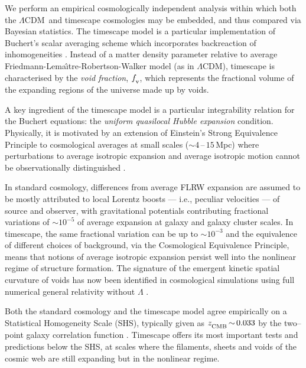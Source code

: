 \documentclass[fleqn,usenatbib,onecolumn,referee]{mnras}
\newcommand{\LA}{\Lambda}
\newcommand{\LCDM}{$\LA$CDM}
\newcommand{\goesas}{\mathop{\sim}\limits}
\newcommand{\Ns}[1]{_{\lower2pt\hbox{$\scriptstyle\rm#1$}}}
\begin{document}
We perform an empirical cosmologically independent analysis within which both the \LCDM\ and timescape cosmologies may be embedded, and thus compared via Bayesian statistics. The timescape model is a particular implementation of Buchert’s scalar averaging scheme which incorporates backreaction of inhomogeneities \citep{Buchert_2000, Buchert_2001, Buchert_2020, Wiltshire_2014_cosmic}. Instead of a matter density parameter relative to average Friedmann-Lema\^{\i}tre-Robertson-Walker model (as in $\Lambda$CDM), timescape is characterised by the \textit{void fraction}, $f\Ns{v}$, which represents the fractional volume of the expanding regions of the universe made up by voids.

A key ingredient of the timescape model is a particular integrability relation for the Buchert equations: the {\em uniform quasilocal Hubble expansion} condition. Physically, it is motivated by an extension of Einstein's Strong Equivalence Principle to cosmological averages at small scales ($\goesas4\,$--$\,15\,$Mpc) where perturbations to average isotropic expansion and average isotropic motion cannot be observationally distinguished \citep{Wiltshire_2008}. 

In standard cosmology, differences from average FLRW expansion are assumed to be mostly attributed to local Lorentz boosts --- i.e., peculiar velocities --- of source and observer, with gravitational potentials contributing fractional variations of $\goesas10^{-5}$ of average expansion at galaxy and galaxy cluster scales. In timescape, the same fractional variation can be up to $\goesas10^{-3}$ and the equivalence of different choices of background, via the Cosmological Equivalence Principle, means that notions of average isotropic expansion persist well into the nonlinear regime of structure formation. The signature of the emergent kinetic spatial curvature of voids has now been identified in cosmological simulations using full numerical general relativity without $\Lambda$ \citep{Williams_2024}. 

Both the standard cosmology and the timescape model agree empirically on a Statistical Homogeneity Scale (SHS), typically given as $z \Ns {CMB} \goesas 0.033$ by the two--point galaxy correlation function \citep{Hogg_2005, Scrimgeour_2012, Dam_2017}. Timescape offers its most important tests and predictions below the SHS, at scales where the filaments, sheets and voids of the cosmic web are still expanding but in the nonlinear regime.
\end{document}
